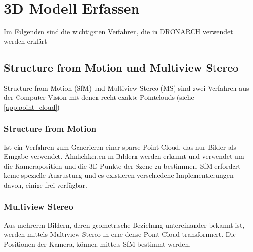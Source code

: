 \documentclass{paper}
\begin{document}
	
	
	\section{3D Modell Erfassen}\label{scan_methods}
		Im Folgenden sind die wichtigsten Verfahren, die in DRONARCH verwendet werden erklärt
		
		\subsection{Structure from Motion und Multiview Stereo}
			Structure from Motion (SfM) und Multiview Stereo (MS) sind zwei Verfahren aus der Computer Vision mit denen recht exakte Pointclouds (siehe \autoref{app:point_cloud})
		
		\subsubsection{Structure from Motion}
			Ist ein Verfahren zum Generieren einer sparse Point Cloud, das nur Bilder als Eingabe verwendet.
			Ähnlichkeiten in Bildern werden erkannt und verwendet um die Kameraposition und die 3D Punkte der Szene zu bestimmen.
			SfM erfordert keine spezielle Ausrüstung und es existieren verschiedene Implementierungen davon, einige frei verfügbar.
		
		\subsubsection{Multiview Stereo}
			Aus mehreren Bildern, deren geometrische Beziehung untereinander bekannt ist, werden mittels Multiview Stereo in eine dense Point Cloud transformiert. Die Positionen der Kamera, können mittels SfM bestimmt werden.
			
%		
%			
			
\end{document}
